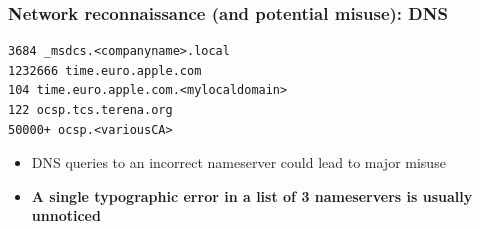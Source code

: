 \documentclass{beamer}
\begin{document}
\begin{frame}[fragile]
\frametitle{Network reconnaissance (and potential misuse): DNS}

\begin{lstlisting}
3684 _msdcs.<companyname>.local
1232666 time.euro.apple.com
104 time.euro.apple.com.<mylocaldomain>
122 ocsp.tcs.terena.org
50000+ ocsp.<variousCA>
\end{lstlisting}
\begin{itemize}
\item DNS queries to an incorrect nameserver could lead to major misuse
\item {\bf A single typographic error in a list of 3 nameservers is usually unnoticed}
\end{itemize}
\end{frame}
\end{document}
